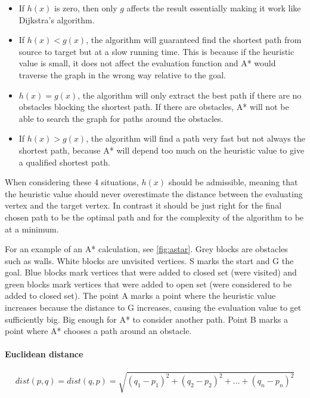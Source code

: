     \begin{itemize}
    \item If $h(x)$ is zero, then only $g$ affects the result essentially making it work like Dijkstra's algorithm.

    \item If $h(x) < g(x)$, the algorithm will guaranteed find the shortest path from source to target but at a slow running time. This is because if the heuristic value is small, it does not affect the evaluation function and A* would traverse the graph in the wrong way relative to the goal.

    \item $h(x) = g(x)$, the algorithm will only extract the best path if there are no obstacles blocking the shortest path. If there are obstacles, A* will not be able to search the graph for paths around the obstacles.

    \item If $h(x) > g(x)$, the algorithm will find a path very fast but not always the shortest path, because A* will depend too much on the heuristic value to give a qualified shortest path.
  \end{itemize}

  When considering these 4 situations, $h(x)$ should be admissible, meaning that the heuristic value should never overestimate the distance between the evaluating vertex and the target vertex. In contrast it should be just right for the final chosen path to be the optimal path and for the complexity of the algorithm to be at a minimum. 

  For an example of an A* calculation, see \cref{fig:astar}. 
  Grey blocks are obstacles such as walls. White blocks are unvisited vertices. S marks the start and G the goal. Blue blocks mark vertices that were added to closed set (were visited) and green blocks mark vertices that were added to open set (were considered to be added to closed set). The point A marks a point where the heuristic value increases because the distance to G increases, causing the evaluation value to get sufficiently big. Big enough for A* to consider another path. Point B marks a point where A* chooses a path around an obstacle.

  \paragraph{Euclidean distance}\cite{wiki_euclidean}

  \[
    dist(p, q) = dist(q, p) = \sqrt{(q_{1} - p_{1})^2 + (q_{2} - p_{2})^2 + \dots + (q_{n} - p_{n})^2}
  \]

